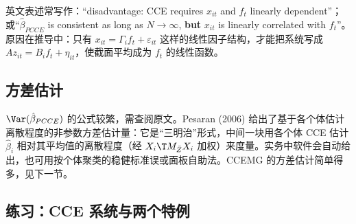 英文表述常写作：“disadvantage: CCE requires $x_{it}$ and $f_t$ linearly dependent”；或“$\hat\beta_{PCCE}$ is consistent as long as $N\to\infty$, \textbf{but} $x_{it}$ is linearly correlated with $f_t$”。原因在推导中：只有 $x_{it}=\Gamma_if_t+\varepsilon_{it}$ 这样的线性因子结构，才能把系统写成 $Az_{it}=B_if_t+\eta_{it}$，使截面平均成为 $f_t$ 的线性函数。

\subsection{方差估计}

$\Var(\hat\beta_{PCCE})$ 的公式较繁，需查阅原文。Pesaran (2006) 给出了基于各个体估计离散程度的非参数方差估计量：它是“三明治”形式，中间一块用各个体 CCE 估计 $\hat\beta_i$ 相对其平均值的离散程度（经 $X_i\T M_{\bar Z}X_i$ 加权）来度量。实务中软件会自动给出，也可用按个体聚类的稳健标准误或面板自助法。CCEMG 的方差估计简单得多，见下一节。

\subsection{练习：CCE 系统与两个特例}

